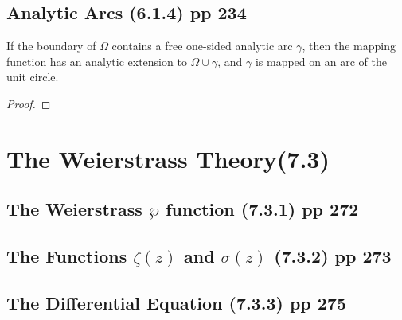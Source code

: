\subsection{Analytic Arcs (6.1.4) pp 234}
\begin{theorem}
	If the boundary of $\Omega$ contains a free one-sided analytic arc $\gamma$, then the mapping function has an analytic extension to $\Omega \cup \gamma$, and $\gamma$ is mapped on an arc of the unit circle.
\end{theorem}
\begin{proof}
\end{proof}

\section{The Weierstrass Theory(7.3)}
\subsection{The Weierstrass $\wp$ function (7.3.1) pp 272}
\subsection{The Functions $\zeta(z)$ and $\sigma(z)$ (7.3.2) pp 273}
\subsection{The Differential Equation (7.3.3) pp 275}

